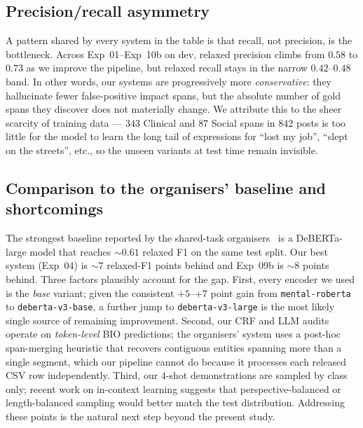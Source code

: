 \documentclass[journal]{IEEEtran}
\begin{document}
\subsection{Precision/recall asymmetry}
A pattern shared by every system in the table is that recall, not
precision, is the bottleneck. Across Exp~01--Exp~10b on dev,
relaxed precision climbs from $0.58$ to $0.73$ as we improve the
pipeline, but relaxed recall stays in the narrow $0.42$--$0.48$
band. In other words, our systems are progressively more
\emph{conservative}: they hallucinate fewer false-positive impact
spans, but the absolute number of gold spans they discover does not
materially change. We attribute this to the sheer scarcity of
training data --- $343$ Clinical and $87$ Social spans in $842$
posts is too little for the model to learn the long tail of
expressions for ``lost my job'', ``slept on the streets'', etc., so
the unseen variants at test time remain invisible.

\subsection{Comparison to the organisers' baseline and shortcomings}
The strongest baseline reported by the shared-task
organisers~\cite{dey2025inference} is a DeBERTa-large model that
reaches $\sim$$0.61$ relaxed F1 on the same test split. Our best
system (Exp~04) is $\sim$$7$ relaxed-F1 points behind and Exp~09b
is $\sim$$8$ points behind. Three factors plausibly account for the
gap. First, every encoder we used is the \emph{base} variant; given
the consistent $+5$--$+7$ point gain from \texttt{mental-roberta}
to \texttt{deberta-v3-base}, a further jump to
\texttt{deberta-v3-large} is the most likely single source of
remaining improvement. Second, our CRF and LLM audits operate on
\emph{token-level} BIO predictions; the organisers' system uses a
post-hoc span-merging heuristic that recovers contiguous entities
spanning more than a single segment, which our pipeline cannot do
because it processes each released CSV row independently. Third, our
$4$-shot demonstrations are sampled by class only; recent work on
in-context learning suggests that perspective-balanced or
length-balanced sampling would better match the test distribution.
Addressing these points is the natural next step beyond the present
study.
\end{document}

